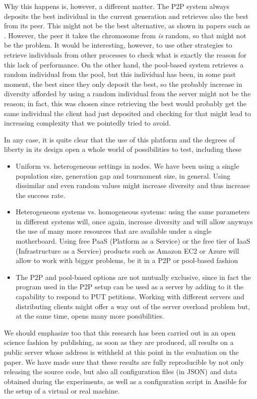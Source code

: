 \documentclass{sig-alternate}
\begin{document}
Why this happens is, however, a different matter. The P2P system
always deposits the best individual in the current generation and
retrieves also the best from its peer. This might not be the best
alternative, as shown in papers such as
\cite{multikulti:cec09}. However, the peer it takes the chromosome
from {\em is} random, so that might not be the problem. It would be
interesting, however, to use other strategies to retrieve individuals
from other processes to check what is exactly the reason for this lack
of performance. On the other hand, the pool-based system retrieves a
random individual from the pool, but this individual has been, in some
past moment, the best since they only deposit the best, so the
probably increase in diversity afforded by using a random individual
from the server might not be the reason; in fact, this was chosen
since retrieving the best would probably get the same individual the
client had just deposited and checking for that might lead to
increasing complexity that we pointedly tried to avoid. 

In any case, it is quite clear that the use of this platform and the
degrees of liberty in its design open a whole world of possibilities
to test, including these \begin{itemize}
\item Uniform vs. heterogeneous settings in nodes. We have been using a
  single population size, generation gap and tournament size, in
  general. Using dissimilar and even random values might increase
  diversity and thus increase the success rate.
\item Heterogeneous systems vs. homogeneous systems: using the same
  parameters in different systems will, once again, increase diversity
  and will allow anyways the use of many more resources that are
  available under a single motherboard. Using free PaaS (Platform as a Service) or the free
  tier of IaaS (Infrastructure as a Service) products such as Amazon EC2 or Azure will allow to work
  with bigger problems, be it in a P2P or pool-based fashion
\item The P2P and pool-based options are not mutually exclusive, since
  in fact the program used in the P2P setup can be used as a server by
  adding to it the capability to respond to PUT petitions. Working
  with different servers and distributing clients might offer a way
  out of the server overload problem but, at the same time, opens many
  more possibilities.
\end{itemize}

We should emphasize too that this research has been carried out in an
open science fashion by publishing, as soon as they are produced, all
results on a public server whose address is withheld at this point in
the evaluation on the paper. We have made sure that these results are
fully reproducible by not only releasing the source code, but also
all configuration files (in JSON) and data obtained during the
experiments, as well as a configuration script in Ansible for the
setup of a virtual or real machine.
\end{document}
